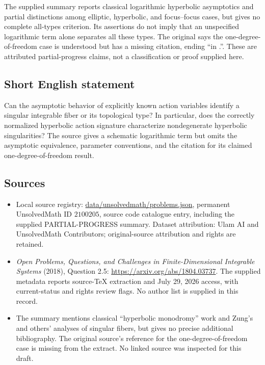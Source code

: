 \documentclass[11pt]{article}
\begin{document}
The supplied summary reports classical logarithmic hyperbolic asymptotics and partial distinctions among elliptic, hyperbolic, and focus--focus cases, but gives no complete all-types criterion. Its assertions do not imply that an unspecified logarithmic term alone separates all these types. The original says the one-degree-of-freedom case is understood but has a missing citation, ending ``in .''. These are attributed partial-progress claims, not a classification or proof supplied here.
\subsection{Short English statement}
Can the asymptotic behavior of explicitly known action variables identify a singular integrable fiber or its topological type? In particular, does the correctly normalized hyperbolic action signature characterize nondegenerate hyperbolic singularities? The source gives a schematic logarithmic term but omits the asymptotic equivalence, parameter conventions, and the citation for its claimed one-degree-of-freedom result.
\subsection{Sources}
\begin{itemize}
\item Local source registry: \url{data/unsolvedmath/problems.json}, permanent UnsolvedMath ID $2100205$, source code catalogue entry, including the supplied PARTIAL-PROGRESS summary. Dataset attribution: Ulam AI and UnsolvedMath Contributors; original-source attribution and rights are retained.
\item \emph{Open Problems, Questions, and Challenges in Finite-Dimensional Integrable Systems} (2018), Question 2.5: \url{https://arxiv.org/abs/1804.03737}. The supplied metadata reports source-TeX extraction and July 29, 2026 access, with current-status and rights review flags. No author list is supplied in this record.
\item The summary mentions classical ``hyperbolic monodromy'' work and Zung's and others' analyses of singular fibers, but gives no precise additional bibliography. The original source's reference for the one-degree-of-freedom case is missing from the extract. No linked source was inspected for this draft.
\end{itemize}
\end{document}
